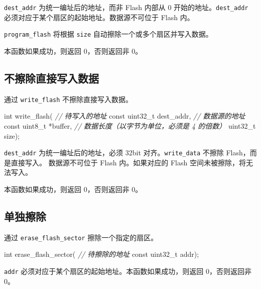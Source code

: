 \documentclass[
  12pt,
]{book}
\newenvironment{Shaded}{\begin{snugshade}}{\end{snugshade}}
\newcommand{\CommentTok}[1]{\textcolor[rgb]{0.56,0.35,0.01}{\textit{#1}}}
\newcommand{\DataTypeTok}[1]{\textcolor[rgb]{0.13,0.29,0.53}{#1}}
\newcommand{\NormalTok}[1]{#1}
\begin{document}
\texttt{dest\_addr} 为统一编址后的地址，而非 Flash 内部从 0 开始的地址。\texttt{dest\_addr}
必须对应于某个扇区的起始地址。数据源不可位于 Flash 内。

\texttt{program\_flash} 将根据 \texttt{size} 自动擦除一个或多个扇区并写入数据。

本函数如果成功，则返回 0，否则返回非 0。

\hypertarget{ux4e0dux64e6ux9664ux76f4ux63a5ux5199ux5165ux6570ux636e}{%
\subsection{不擦除直接写入数据}\label{ux4e0dux64e6ux9664ux76f4ux63a5ux5199ux5165ux6570ux636e}}

通过 \texttt{write\_flash} 不擦除直接写入数据。

\begin{Shaded}
\begin{Highlighting}[]
\DataTypeTok{int}\NormalTok{ write_flash(}
    \CommentTok{// 待写入的地址}
    \DataTypeTok{const} \DataTypeTok{uint32_t}\NormalTok{ dest_addr,}
    \CommentTok{// 数据源的地址}
    \DataTypeTok{const} \DataTypeTok{uint8_t}\NormalTok{ *buffer,}
    \CommentTok{// 数据长度（以字节为单位，必须是 4 的倍数）}
    \DataTypeTok{uint32_t}\NormalTok{ size);}
\end{Highlighting}
\end{Shaded}

\texttt{dest\_addr} 为统一编址后的地址，必须 32bit 对齐。\texttt{write\_data} 不擦除 Flash，而是直接写入。
数据源不可位于 Flash 内。如果对应的 Flash 空间未被擦除，将无法写入。

本函数如果成功，则返回 0，否则返回非 0。

\hypertarget{ux5355ux72ecux64e6ux9664}{%
\subsection{单独擦除}\label{ux5355ux72ecux64e6ux9664}}

通过 \texttt{erase\_flash\_sector} 擦除一个指定的扇区。

\begin{Shaded}
\begin{Highlighting}[]
\DataTypeTok{int}\NormalTok{ erase_flash_sector(}
    \CommentTok{// 待擦除的地址}
    \DataTypeTok{const} \DataTypeTok{uint32_t}\NormalTok{ addr);}
\end{Highlighting}
\end{Shaded}

\texttt{addr} 必须对应于某个扇区的起始地址。本函数如果成功，则返回 0，否则返回非 0。
\end{document}
